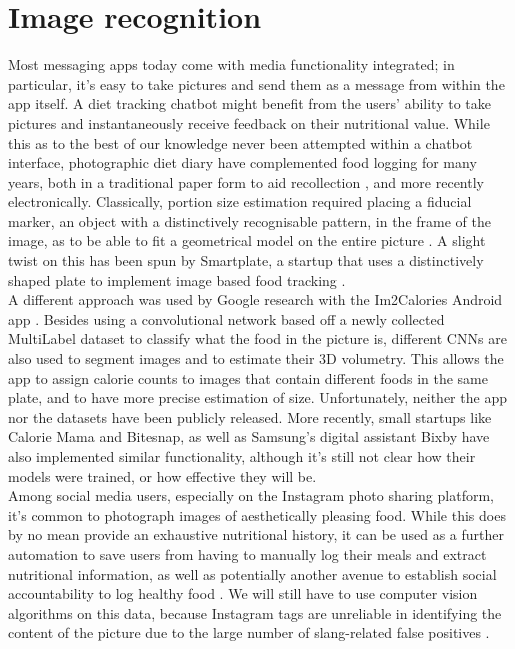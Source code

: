 \section{Image recognition}
Most messaging apps today come with media functionality integrated; in particular, it's easy to take pictures and send them as a message from within the app itself. A diet tracking chatbot might benefit from the users' ability to take pictures and instantaneously receive feedback on their nutritional value. While this as to the best of our knowledge never been attempted within a chatbot interface, photographic diet diary have complemented food logging for many years, both in a traditional paper form to aid recollection \cite{Higgins2009}, and more recently electronically. Classically, portion size estimation required placing a fiducial marker, an object with a distinctively recognisable pattern, in the frame of the image, as to be able to fit a geometrical model on the entire picture \cite{Ahmad2016}. A slight twist on this has been spun by Smartplate, a startup that uses a distinctively shaped plate to implement image based food tracking \cite{smartplate}.\\
A different approach was used by Google research with the Im2Calories Android app \cite{Myers2015}. Besides using a convolutional network based off a newly collected MultiLabel dataset to classify what the food in the picture is, different CNNs are also used to segment images and to estimate their 3D volumetry. This allows the app to assign calorie counts to images that contain different foods in the same plate, and to have more precise estimation of size. Unfortunately, neither the app nor the datasets have been publicly released. More recently, small startups like Calorie Mama\cite{caloriemamaai} and Bitesnap\cite{bitesnap}, as well as Samsung's digital assistant Bixby \cite{bixbyarticle} have also implemented similar functionality, although it's still not clear how their models were trained, or how effective they will be. \\
Among social media users, especially on the Instagram photo sharing platform, it's common to photograph images of aesthetically pleasing food. While this does by no mean provide an exhaustive nutritional history, it can be used as a further automation to save users from having to manually log their meals and extract nutritional information, as well as potentially another avenue to establish social accountability to log healthy food \cite{Sharma:2015:MCN:2740908.2742754}. We will still have to use computer vision algorithms on this data, because Instagram tags are unreliable in identifying the content of the picture due to the large number of slang-related false positives \cite{hospedales2016}.

